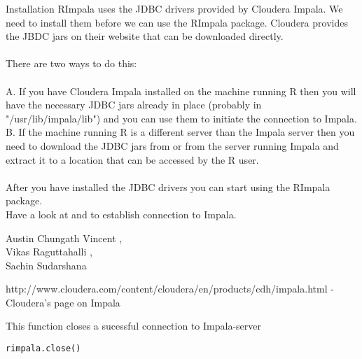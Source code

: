 \documentclass[letterpaper]{book}
\begin{document}
%
\begin{Section}{Installation}
RImpala uses the JDBC drivers provided by Cloudera Impala. We need to install them before we can use the RImpala package. Cloudera provides the JBDC jars on their website that can be downloaded directly.\\{}
\\{}
There are two ways to do this:\\{}
\\{}
A. If you have Cloudera Impala installed on the machine running R then you will have the necessary JDBC jars already in place (probably in "/usr/lib/impala/lib") and you can use them to initiate the connection to Impala.\\{}
B. If the machine running R is a different server than the Impala server then you need to download the JDBC jars from  or from the server running Impala and extract it to a location that can be accessed by the R user.\\{}
\\{}
After you have installed the JDBC drivers you can start using the RImpala package.\\{}
Have a look at  and  to establish connection to Impala.\\{}
\end{Section}
%
\begin{Author}\relax
Austin Chungath Vincent ,\\{}
Vikas Raguttahalli ,\\{}
Sachin Sudarshana 
\end{Author}
%
\begin{References}\relax
http://www.cloudera.com/content/cloudera/en/products/cdh/impala.html - Cloudera's page on Impala
\end{References}
%
\begin{Description}\relax
This function closes a sucessful connection to Impala-server
\end{Description}
%
\begin{Usage}
\begin{verbatim}
rimpala.close()
\end{verbatim}
\end{Usage}
\end{document}
